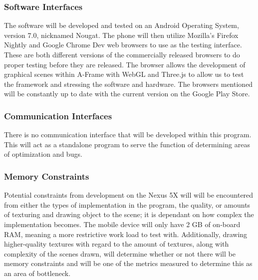 \documentclass[letterpaper,10pt,titlepage,draftclsnofoot,onecolumn,compsoc,utf8,latin1]{IEEEtran}
\begin{document}
\begin{singlespace}
\subsubsection{Software Interfaces}
\begin{singlespace}
\noindent
The software will be developed and tested on an Android Operating System, version 7.0, nicknamed Nougat. The phone will then utilize Mozilla's Firefox Nightly and Google Chrome Dev web browsers to use as the testing interface. These are both different versions of the commercially released browsers to do proper testing before they are released. The browser allows the development of graphical scenes within A-Frame with WebGL and Three.js to allow us to test the framework and stressing the software and hardware. The browsers mentioned will be constantly up to date with the current version on the Google Play Store.
\end{singlespace}

\subsubsection{Communication Interfaces}
\begin{singlespace}
\noindent
There is no communication interface that will be developed within this program. This will act as a standalone program to serve the function of determining areas of optimization and bugs.
\end{singlespace}

\subsubsection{Memory Constraints}
\begin{singlespace}
\noindent
Potential constraints from development on the Nexus 5X will will be encountered from either the types of implementation in the program, the quality, or amounts of texturing and drawing object to the scene; it is dependant on how complex the implementation becomes. The mobile device will only have 2 GB of on-board RAM, meaning a more restrictive work load to test with. Additionally, drawing higher-quality textures with regard to the amount of textures, along with complexity of the scenes drawn, will determine whether or not there will be memory constraints and will be one of the metrics measured to determine this as an area of bottleneck.
\end{singlespace}

\end{singlespace}
\end{document}
